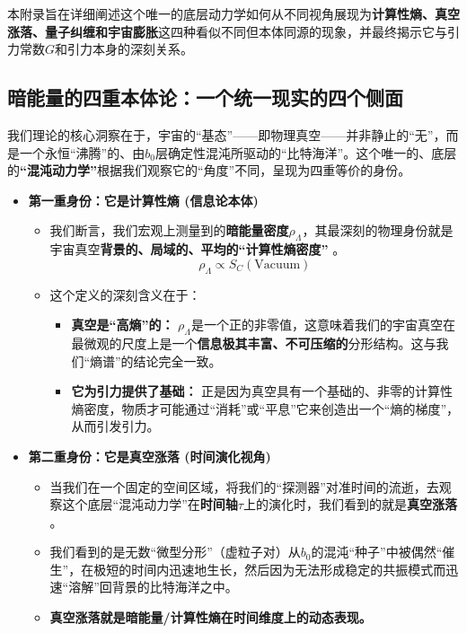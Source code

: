 \documentclass[11pt, a4paper]{article}
\begin{document}
本附录旨在详细阐述这个唯一的底层动力学如何从不同视角展现为\textbf{计算性熵、真空涨落、量子纠缠和宇宙膨胀}这四种看似不同但本体同源的现象，并最终揭示它与引力常数$G$和引力本身的深刻关系。

\subsection{暗能量的四重本体论：一个统一现实的四个侧面}

我们理论的核心洞察在于，宇宙的“基态”——即物理真空——并非静止的“无”，而是一个永恒“沸腾”的、由$b_0$层确定性混沌所驱动的“比特海洋”。这个唯一的、底层的\textbf{“混沌动力学”}根据我们观察它的“角度”不同，呈现为四重等价的身份。

\begin{itemize}
    \item \textbf{第一重身份：它是计算性熵 (信息论本体)}
    \begin{itemize}
        \item 我们断言，我们宏观上测量到的\textbf{暗能量密度$\rho_\Lambda$}，其最深刻的物理身份就是宇宙真空\textbf{背景的、局域的、平均的“计算性熵密度”} \cite{Kolmogorov1965, Planck2020}。
        \[
        \rho_\Lambda \propto S_C(\text{Vacuum})
        \]
        \item 这个定义的深刻含义在于：
        \begin{itemize}
            \item \textbf{真空是“高熵”的：} $\rho_\Lambda$是一个正的非零值，这意味着我们的宇宙真空在最微观的尺度上是一个\textbf{信息极其丰富、不可压缩的}分形结构。这与我们“熵谱”的结论完全一致。
            \item \textbf{它为引力提供了基础：} 正是因为真空具有一个基础的、非零的计算性熵密度，物质才可能通过“消耗”或“平息”它来创造出一个“熵的梯度”，从而引发引力。
        \end{itemize}
    \end{itemize}

    \item \textbf{第二重身份：它是真空涨落 (时间演化视角)}
    \begin{itemize}
        \item 当我们在一个固定的空间区域，将我们的“探测器”对准时间的流逝，去观察这个底层“混沌动力学”在\textbf{时间轴$\tau$}上的演化时，我们看到的就是\textbf{真空涨落} \cite{deBroglie1930}。
        \item 我们看到的是无数“微型分形”（虚粒子对）从$b_0$的混沌“种子”中被偶然“催生”，在极短的时间内迅速地生长，然后因为无法形成稳定的共振模式而迅速“溶解”回背景的比特海洋之中。
        \item \textbf{真空涨落就是暗能量/计算性熵在时间维度上的动态表现。}
    \end{itemize}


\end{itemize}
\end{document}
